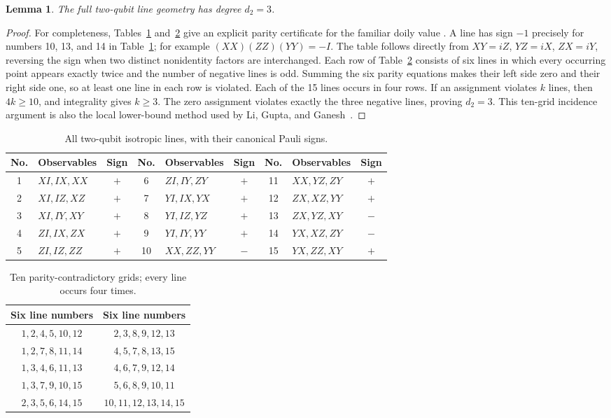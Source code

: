 \documentclass[10pt]{article}
\newtheorem{lemma}[theorem]{Lemma}
\begin{document}
\begin{lemma}\label{lem:doily}
The full two-qubit line geometry has degree $d_2=3$.
\end{lemma}
\begin{proof}
For completeness, Tables~\ref{tab:lines} and~\ref{tab:grids} give an explicit
parity certificate for the familiar doily value
\cite[Section~2, Figure~4]{saniga}. A line has sign $-1$ precisely for
numbers 10, 13, and 14 in Table~\ref{tab:lines}; for example
$(XX)(ZZ)(YY)=-I$. The table follows directly from
$XY=iZ$, $YZ=iX$, $ZX=iY$, reversing the sign when two distinct
nonidentity factors are interchanged.
Each row of Table~\ref{tab:grids} consists of six lines in which every
occurring point appears exactly twice and the number of negative lines is odd.
Summing the six parity equations makes their left side zero and their right
side one, so at least one line in each row is violated. Each of the 15 lines
occurs in four rows. If an assignment violates $k$ lines, then $4k\ge10$,
and integrality gives $k\ge3$. The zero assignment violates exactly the
three negative lines, proving $d_2=3$.
This ten-grid incidence argument is also the local lower-bound method used
by Li, Gupta, and Ganesh~\cite[Lemma~8 and Proposition~10]{li}.
\end{proof}

\begin{table}[ht]
\centering\small\setlength{\tabcolsep}{3pt}
\begin{tabular}{clc@{\qquad}clc@{\qquad}clc}
\toprule
No.&Observables&Sign&No.&Observables&Sign&No.&Observables&Sign\\
\midrule
1&$XI,IX,XX$&$+$&6&$ZI,IY,ZY$&$+$&11&$XX,YZ,ZY$&$+$\\
2&$XI,IZ,XZ$&$+$&7&$YI,IX,YX$&$+$&12&$ZX,XZ,YY$&$+$\\
3&$XI,IY,XY$&$+$&8&$YI,IZ,YZ$&$+$&13&$ZX,YZ,XY$&$-$\\
4&$ZI,IX,ZX$&$+$&9&$YI,IY,YY$&$+$&14&$YX,XZ,ZY$&$-$\\
5&$ZI,IZ,ZZ$&$+$&10&$XX,ZZ,YY$&$-$&15&$YX,ZZ,XY$&$+$\\
\bottomrule
\end{tabular}
\caption{All two-qubit isotropic lines, with their canonical Pauli signs.}
\label{tab:lines}
\end{table}
\begin{table}[ht]
\centering\small
\begin{tabular}{c@{\quad}c}
\toprule
Six line numbers&Six line numbers\\
\midrule
$1,2,4,5,10,12$&$2,3,8,9,12,13$\\
$1,2,7,8,11,14$&$4,5,7,8,13,15$\\
$1,3,4,6,11,13$&$4,6,7,9,12,14$\\
$1,3,7,9,10,15$&$5,6,8,9,10,11$\\
$2,3,5,6,14,15$&$10,11,12,13,14,15$\\
\bottomrule
\end{tabular}
\caption{Ten parity-contradictory grids; every line occurs four times.}
\label{tab:grids}
\end{table}
\end{document}
